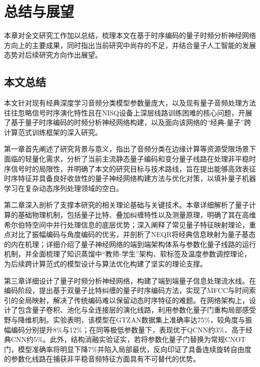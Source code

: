 
\section{总结与展望}
\label{chap:conclusion}

本章对全文研究工作加以总结，梳理本文在基于时序编码的量子时频分析神经网络方向上的主要成果，同时指出当前研究中尚存的不足，并结合量子人工智能的发展态势对后续研究方向作出展望。

\subsection{本文总结}
\label{sec:summary}

本文针对现有经典深度学习音频分类模型参数量庞大，以及现有量子音频处理方法往往忽略信号时序演化特性且在NISQ设备上深层线路训练困难的核心问题，开展了基于量子时序编码的时频分析神经网络构建，以及面向该网络的“经典-量子”跨计算范式训练框架的深入研究。

第一章首先阐述了研究背景与意义，指出了音频分类在边缘计算等资源受限场景下面临的轻量化需求，分析了当前主流静态量子编码和变分量子线路在处理非平稳时序信号时的局限性，并明确了本文的研究目标与技术路线，旨在提出能够高效表征时序特征并具备良好收敛性的量子神经网络构建方法与优化对策，以填补量子机器学习在复杂动态序列处理领域的空白。

第二章深入剖析了支撑本研究的相关理论基础与关键技术。本章详细解析了量子计算的基础物理机制，包括量子比特、叠加纠缠特性以及测量原理，明确了其在高维希尔伯特空间中并行处理信息的底层优势；深入阐释了常见量子特征映射理论，重点对比了振幅编码与角度编码的优劣，并剖析了NEQR将经典信息映射为量子基态的内在机理；详细介绍了量子神经网络的端到端架构体系与参数化量子线路的运行机制，并全面梳理了知识蒸馏中“教师-学生”架构、软标签及温度参数调控理论，为后续跨计算范式的模型设计与算法优化构建了坚实的理论支撑。

第三章详细设计了量子时频分析神经网络，构建了端到端量子信息处理流水线。在编码阶段，提出基于双量子比特纠缠的量子时序编码方法，实现了MFCC与时间索引的全局映射，解决了传统编码难以保留动态时序特征的难题。在网络架构上，设计了包含量子卷积、池化与全连接层的演化线路，利用参数化量子门重构局部感受野与降维机制。实验表明，该模型在GTZAN数据集上准确率达75\%，较角度与振幅编码分别提升8\%与12\%；在同等极低参数量下，表现优于QCNN约3\%、高于经典CNN约5\%。此外，结构消融实验证实，若将参数化量子门替换为常规CNOT门，模型准确率将明显下降7\%并陷入局部最优，反向印证了具备连续旋转自由度的参数化线路在捕获非平稳音频特征方面具有不可替代的优势。

